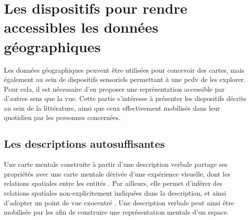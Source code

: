 


\todo{}

\section{Les dispositifs pour rendre accessibles les données géographiques}


Les données géographiques peuvent être utilisées pour concevoir des cartes, mais également au sein de dispositifs sensoriels permettant à une \gls{pcdv} de les explorer. Pour cela, il est nécessaire d'en proposer une représentation accessible par d'autres sens que la vue. Cette partie s'intéresse à présenter les dispositifs décrits au sein de la littérature, ainsi que ceux effectivement mobilisés dans leur quotidien par les personnes concernées.

\subsection{Les descriptions autosuffisantes}



Une carte mentale construite à partir d'une description verbale partage ses propriétés avec une carte mentale dérivée d'une expérience visuelle, dont les relations spatiales entre les entités \cite{Denis1992}. Par ailleurs, elle permet d'inférer des relations spatiales non-explicitement indiquées dans la description, et ainsi d'adopter un point de vue exocentré \cite{Avraamides2004}. Une description verbale peut ainsi être mobilisée par les \pcdvs{} afin de construire une représentation mentale d'un espace.

